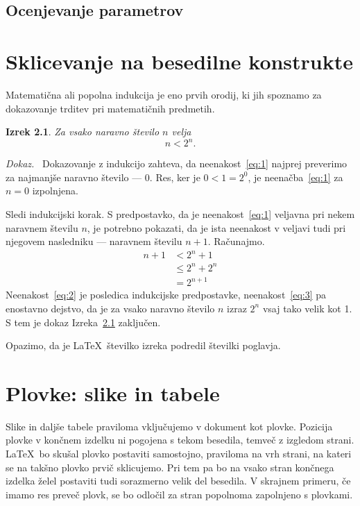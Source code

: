 \documentclass[a4paper, 12pt]{book}
\newtheorem{izrek}{Izrek}[chapter]
\newenvironment{dokaz}{\emph{Dokaz.}\ }{\hspace{\fill}{$\Box$}}
\begin{document}
\section{Ocenjevanje parametrov}

\chapter{Sklicevanje na besedilne konstrukte}
\label{ch1}
Matematična ali popolna indukcija je eno prvih orodij, ki jih spoznamo za dokazovanje trditev pri matematičnih predmetih.
\begin{izrek}
\label{iz:1}
Za vsako naravno število $n$ velja
\begin{equation}
n < 2^n.
\label{eq:1}
\end{equation}
\end{izrek}
\begin{dokaz}
Dokazovanje z indukcijo zahteva, da neenakost~\eqref{eq:1} najprej preverimo za najmanjše naravno število --- $0$. Res, ker je $0 < 1 = 2^0$, je neenačba~\eqref{eq:1} za $n=0$ izpolnjena.

Sledi indukcijski korak. S predpostavko, da je neenakost~\eqref{eq:1} veljavna pri nekem naravnem številu $n$, je potrebno pokazati, da je ista neenakost v veljavi tudi pri njegovem nasledniku --- naravnem številu $n+1$. Računajmo.
\begin{align}
n+1 &< 2^n + 1  \label{eq:2}\\
    &\le 2^n + 2^n \label{eq:3}\\
    &= 2^{n+1} \nonumber
\end{align}
Neenakost~\eqref{eq:2} je posledica indukcijske predpostavke, neenakost~\eqref{eq:3} pa enostavno dejstvo, da je za vsako naravno število $n$ izraz $2^n$ vsaj tako velik kot 1. S tem je dokaz Izreka~\ref{iz:1} zaključen.
\end{dokaz}

Opazimo, da je \LaTeX\ številko izreka podredil številki poglavja.


\chapter{Plovke: slike in tabele}
\label{ch2}
Slike in daljše tabele praviloma vključujemo v dokument kot plovke. Pozicija plovke v končnem izdelku ni pogojena s tekom besedila, temveč z izgledom strani. \LaTeX\ bo skušal plovko postaviti samostojno, praviloma na vrh strani, na kateri se na takšno plovko prvič sklicujemo. Pri tem pa bo na vsako stran končnega izdelka želel postaviti tudi sorazmerno velik del besedila. V skrajnem primeru, če imamo res preveč plovk, se bo odločil za stran popolnoma zapolnjeno s plovkami.
\end{document}
